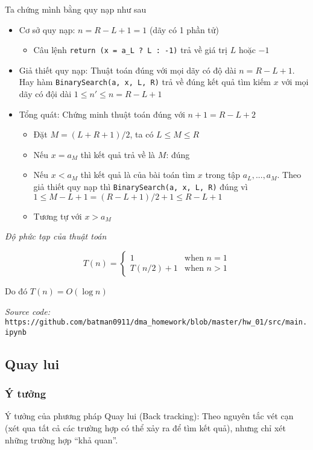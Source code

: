 Ta chứng mình bằng quy nạp như sau 
\begin{itemize}
    \item Cơ sở quy nạp: $n = R - L + 1 = 1$ (dãy có 1 phần tử)
    \begin{itemize}
        \item Câu lệnh \lstinline{return (x = a_L ? L : -1)} trả về giá trị $L$ hoặc $-1$
    \end{itemize}
    
    \item Giả thiết quy nạp: Thuật toán đúng với mọi dãy có độ dài $n = R-L+1$.
    Hay hàm \lstinline{BinarySearch(a, x, L, R)} trả về đúng kết quả tìm kiếm $x$ với mọi dãy
    có đội dài $1 \leq n' \leq n = R - L + 1$

    \item Tổng quát: Chứng minh thuật toán đúng với $n+1 = R-L+2$
    \begin{itemize}
        \item Đặt $M=(L+R+1)/2$, ta có $L \leq M \leq R$
        \item Nếu $x = a_M$ thì kết quả trả về là $M$: đúng
        \item Nếu $x < a_M$ thì kết quả là của bài toán tìm $x$ trong tập $a_L, ... , a_M$.
        Theo giả thiết quy nạp thì \lstinline{BinarySearch(a, x, L, R)} đúng vì 
        $1 \leq M - L + 1 = (R - L + 1)/2 + 1 \leq R - L + 1$
        \item Tương tự với $x > a_M$
    \end{itemize}
\end{itemize}

\textit{Độ phức tạp của thuật toán}

\begin{equation*}
    T(n) = 
    \begin{cases}
        1 & \text{when } n = 1 \\
        T(n/2) + 1 & \text{when } n > 1
    \end{cases}
\end{equation*}

Do đó $T(n) = O(\log n)$

\textit{Source code: } \lstinline{https://github.com/batman0911/dma_homework/blob/master/hw_01/src/main.ipynb}


\subsection{Quay lui}

\subsubsection{Ý tưởng}
Ý tưởng của phương pháp Quay lui (Back tracking): Theo nguyên tắc vét cạn (xét qua tất cả các trường hợp có thể xảy ra để tìm kết quả), nhưng chỉ xét những trường hợp “khả quan”.

